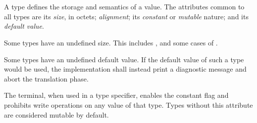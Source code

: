 
\begin{grammar}
 \\
	 \\
	  \\

 \\
	 \\
	 \\
	 \\
	 \\
	 \\
	 \\
	 \\

 \\
	 \\
	 \\
	 \\
	 \\
	 \\
	 \\
	 \\
\end{grammar}

\specsubitem
A type defines the storage and semantics of a value. The attributes common to
all types are its \textit{size}, in octets; \textit{alignment}; its
\textit{constant} or \textit{mutable} nature; and its \textit{default value}.

\specsubitem
Some types have an undefined size. This includes ,
and some cases of .

\specsubitem
Some types have an undefined default value. If the default value of such a type
would be used, the implementation shall instead print a diagnostic message and
abort the translation phase.

\specsubitem
The  terminal, when used in a type specifier, enables the
constant flag and prohibits write operations on any value of that type. Types
without this attribute are considered mutable by default.

